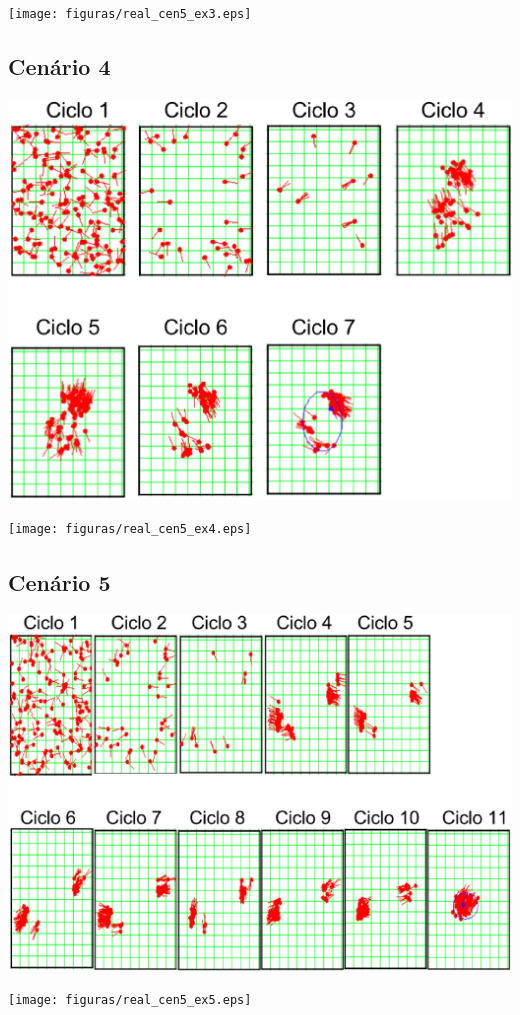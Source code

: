 {\centering
\texttt{[image: figuras/real\_cen5\_ex3.eps]}
\label{img:real_cen5_ex3}
\par}

\subsection{Cenário 4}

{\centering
\includegraphics[scale=0.4]{figuras/cen5_ex4.eps}
\label{img:cen5_ex4}
\par}

{\centering
\texttt{[image: figuras/real\_cen5\_ex4.eps]}
\label{img:real_cen5_ex4}
\par}

\subsection{Cenário 5}

{\centering
\includegraphics[scale=0.4]{figuras/cen5_ex5.eps}
\label{img:cen5_ex5}
\par}

{\centering
\texttt{[image: figuras/real\_cen5\_ex5.eps]}
\label{img:real_cen5_ex5}
\par}
